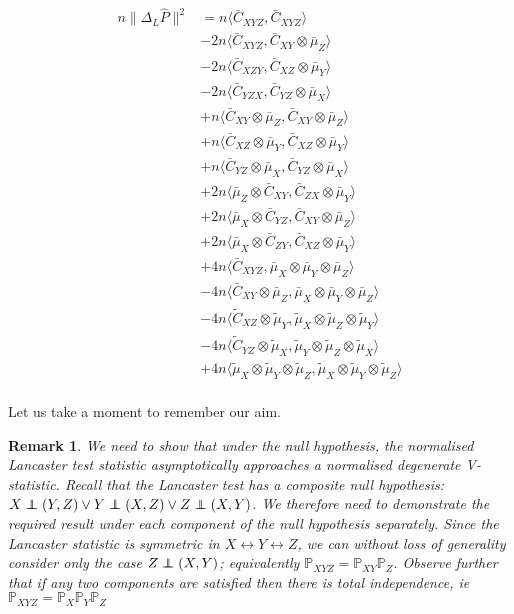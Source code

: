 \documentclass[12pt]{article}
\newcommand\independent{\protect\mathpalette{\protect\independenT}{\perp}}
\def\independenT#1#2{\mathrel{\rlap{$#1#2$}\mkern2mu{#1#2}}}
\newtheorem*{remark}{Remark}
\numberwithin{claim}{section}
\numberwithin{lemma}{section}
\numberwithin{theorem}{section}
\begin{document}
\begin{align*}
n\|\Delta_L \hat{P}\|^2 &= n\langle \bar{C}_{XYZ},\bar{C}_{XYZ} \rangle \\& -
2n\langle \bar{C}_{XYZ},\bar{C}_{XY}\otimes\bar{\mu}_Z \rangle \\& -
2n\langle \bar{C}_{XZY},\bar{C}_{XZ}\otimes\bar{\mu}_Y \rangle \\& -
2n\langle \bar{C}_{YZX},\bar{C}_{YZ}\otimes\bar{\mu}_X \rangle \\& +
n\langle \bar{C}_{XY}\otimes\bar{\mu}_Z,\bar{C}_{XY}\otimes\bar{\mu}_Z \rangle \\& +
n\langle \bar{C}_{XZ}\otimes\bar{\mu}_Y,\bar{C}_{XZ}\otimes\bar{\mu}_Y \rangle \\& +
n\langle \bar{C}_{YZ}\otimes\bar{\mu}_X,\bar{C}_{YZ}\otimes\bar{\mu}_X \rangle \\& +
2n\langle \bar{\mu}_Z\otimes\bar{C}_{XY},\bar{C}_{ZX}\otimes\bar{\mu}_Y \rangle \\& +
2n\langle \bar{\mu}_X\otimes\bar{C}_{YZ},\bar{C}_{XY}\otimes\bar{\mu}_Z \rangle \\& +
2n\langle \bar{\mu}_X\otimes\bar{C}_{ZY},\bar{C}_{XZ}\otimes\bar{\mu}_Y \rangle \\& +
4n\langle \bar{C}_{XYZ},\bar{\mu}_X \otimes\bar{\mu}_Y \otimes \bar{\mu}_Z \rangle \\& -
4n\langle \bar{C}_{XY}\otimes \bar{\mu}_Z,\bar{\mu}_X \otimes\bar{\mu}_Y \otimes \bar{\mu}_Z \rangle \\& -
4n\langle \tilde{C}_{XZ}\otimes \tilde{\mu}_Y,\tilde{\mu}_X \otimes\tilde{\mu}_Z \otimes \tilde{\mu}_Y \rangle \\& -
4n\langle \tilde{C}_{YZ}\otimes \tilde{\mu}_X,\tilde{\mu}_Y \otimes\tilde{\mu}_Z \otimes \tilde{\mu}_X \rangle \\& +
4n\langle \tilde{\mu}_X \otimes\tilde{\mu}_Y \otimes \tilde{\mu}_Z,\tilde{\mu}_X \otimes\tilde{\mu}_Y \otimes \tilde{\mu}_Z \rangle \\
\end{align*}

Let us take a moment to remember our aim.

\begin{remark}
We need to show that under the null hypothesis, the normalised Lancaster test statistic asymptotically approaches a normalised degenerate V-statistic. Recall that the Lancaster test has a composite null hypothesis: $X \independent (Y,Z) \lor Y \independent (X,Z) \lor Z \independent (X,Y)$. We therefore need to demonstrate the required result under each component of the null hypothesis separately. Since the Lancaster statistic is symmetric in $X \leftrightarrow Y \leftrightarrow Z$, we can without loss of generality consider only the case $Z \independent (X,Y)$; equivalently $\mathbb{P}_{XYZ} = \mathbb{P}_{XY} \mathbb{P}_{Z}$. Observe further that if any two components are satisfied then there is total independence, ie $\mathbb{P}_{XYZ} = \mathbb{P}_{X}\mathbb{P}_{Y} \mathbb{P}_{Z}$
\end{remark}
\end{document}
